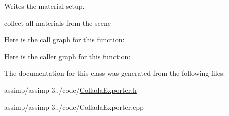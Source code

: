 Writes the material setup. 

collect all materials from the scene 

Here is the call graph for this function\+:




Here is the caller graph for this function\+:




The documentation for this class was generated from the following files\+:\begin{DoxyCompactItemize}
\item 
assimp/assimp-\/3../code/\hyperlink{_collada_exporter_8h}{Collada\+Exporter.\+h}\item 
assimp/assimp-\/3../code/Collada\+Exporter.\+cpp\end{DoxyCompactItemize}
